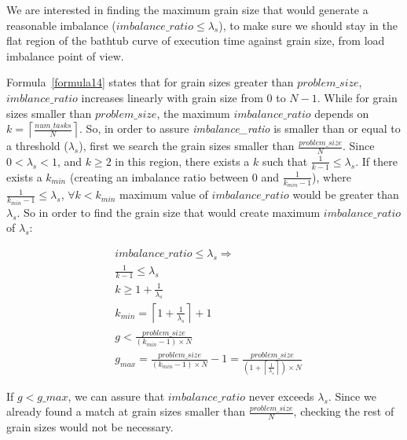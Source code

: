 We are interested in finding the maximum grain size that would generate a reasonable imbalance ($imbalance\_{ratio}\leq{\lambda_s}$), to make sure we should stay in the flat region of the bathtub curve of execution time against grain size, from load imbalance point of view.  

Formula~\ref{formula14} states that for grain sizes greater than $problem\_{size}$, $imblance\_{ratio}$ increases linearly with grain size from $0$ to $N-1$. While for grain sizes smaller than $problem\_{size}$, the maximum $imbalance\_{ratio}$ depends on $k=\left\lceil{\frac{num\_{tasks}}{N}}\right\rceil$. So, in order to assure \emph{imbalance\_{ratio}} is smaller than or equal to a threshold ($\lambda_s$), first we search the grain sizes smaller than $\frac{problem\_{size}}{N}$. Since $0<\lambda_s<1$, and $k\geq2$ in this region, there exists a $k$ such that $\frac{1}{k-1}\leq\lambda_s$.    
If there exists a $k_{min}$ (creating an imbalance ratio between $0$ and $\frac{1}{k_{min}-1}$), where $\frac{1}{k_{min}-1}\leq{\lambda_s}$, $\forall k<k_{min}$ maximum value of $imbalance\_{ratio}$ would be greater than $\lambda_s$. So in order to find the grain size that would create maximum $imbalance\_{ratio}$ of $\lambda_s$:



\begin{equation}\label{formula21}
\begin{aligned}
&imbalance\_{ratio}\leq{{\lambda_s}}\Rightarrow\\
&\frac{1}{k-1}\leq\lambda_s\\
&k\geq{1+\frac{1}{\lambda_s}}\\
&k_{min}=\left\lceil{1+\frac{1}{\lambda_s}}\right\rceil+1\\
&{g}<\frac{problem\_{size}}{(k_{min}-1)\times{N}}\\
&g_{max}=\frac{problem\_{size}}{(k_{min}-1)\times{N}}-1=\frac{problem\_{size}}{(1+\left\lceil{\frac{1}{\lambda_s}}\right\rceil)\times{N}}
\end{aligned}
\end{equation}

If $g<g\_{max}$, we can assure that $imbalance\_{ratio}$ never exceeds $\lambda_s$. Since we already found a match at grain sizes smaller than $\frac{problem\_{size}}{N}$, checking the rest of grain sizes would not be necessary.







\vspace{\baselineskip}
